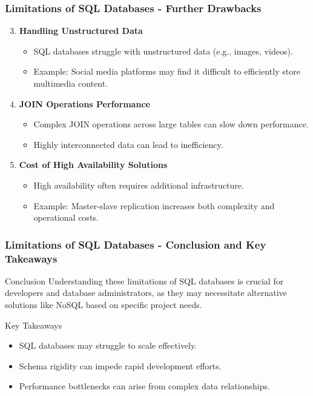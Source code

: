 \documentclass[aspectratio=169]{beamer}
\begin{document}
\begin{frame}[fragile]
    \frametitle{Limitations of SQL Databases - Further Drawbacks}
    \begin{enumerate}
        \setcounter{enumi}{2} %
        \item \textbf{Handling Unstructured Data}
            \begin{itemize}
                \item SQL databases struggle with unstructured data (e.g., images, videos).
                \item Example: Social media platforms may find it difficult to efficiently store multimedia content.
            \end{itemize}
        \item \textbf{JOIN Operations Performance}
            \begin{itemize}
                \item Complex JOIN operations across large tables can slow down performance.
                \item Highly interconnected data can lead to inefficiency.
            \end{itemize}
        \item \textbf{Cost of High Availability Solutions}
            \begin{itemize}
                \item High availability often requires additional infrastructure.
                \item Example: Master-slave replication increases both complexity and operational costs.
            \end{itemize}
    \end{enumerate}
\end{frame}

\begin{frame}[fragile]
    \frametitle{Limitations of SQL Databases - Conclusion and Key Takeaways}
    \begin{block}{Conclusion}
        Understanding these limitations of SQL databases is crucial for developers and database administrators, as they may necessitate alternative solutions like NoSQL based on specific project needs.
    \end{block}
    \begin{block}{Key Takeaways}
        \begin{itemize}
            \item SQL databases may struggle to scale effectively.
            \item Schema rigidity can impede rapid development efforts.
            \item Performance bottlenecks can arise from complex data relationships.
        \end{itemize}
    \end{block}
\end{frame}
\end{document}
